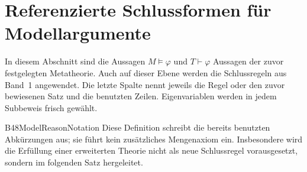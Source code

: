\section{Referenzierte Schlussformen f\"ur Modellargumente}

In diesem Abschnitt sind die Aussagen \(M\models\varphi\) und
\(T\vdash\varphi\) Aussagen der zuvor festgelegten Metatheorie.
Auch auf dieser Ebene werden die Schlussregeln aus Band~1 angewendet.
Die letzte Spalte nennt jeweils die Regel oder den zuvor bewiesenen
Satz und die benutzten Zeilen. Eigenvariablen werden in jedem
Subbeweis frisch gew\"ahlt.

{B48ModelReasonNotation}{
}
Diese Definition schreibt die bereits benutzten Abk\"urzungen aus;
sie f\"uhrt kein zus\"atzliches Mengenaxiom ein. Insbesondere wird
die Erf\"ullung einer erweiterten Theorie nicht als neue
Schlussregel vorausgesetzt, sondern im folgenden Satz hergeleitet.


